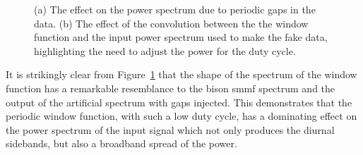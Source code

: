 \begin{figure}[ht!]
	\centering
	\qquad
	\caption{(a) The effect on the power spectrum due to periodic gaps in the data. (b) The effect of the convolution between the the window function and the input power spectrum used to make the fake data, highlighting the need to adjust the power for the duty cycle.}
	\label{fig:window_function_PSDs}
\end{figure}


It is strikingly clear from Figure~\ref{fig:window_function_PSDs} that the shape of the spectrum of the window function has a remarkable resemblance to the \gls{bison} \gls{smmf} spectrum and the output of the artificial spectrum with gaps injected. This demonstrates that the periodic window function, with such a low duty cycle, has a dominating effect on the power spectrum of the input signal which not only produces the diurnal sidebands, but also a broadband spread of the power.


